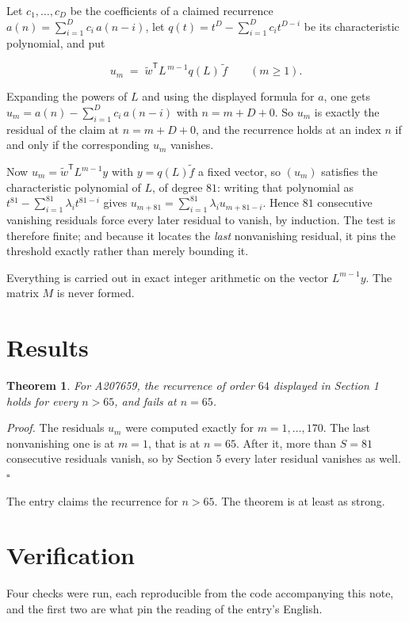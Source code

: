 \documentclass[11pt]{article}
\newtheorem{theorem}{Theorem}
\theoremstyle{definition}
\begin{document}
Let $c_1,\dots,c_D$ be the coefficients of a claimed recurrence $a(n) = \sum_{i=1}^{D} c_i\,a(n-i)$, let $q(t) = t^{D} - \sum_{i=1}^{D} c_i t^{D-i}$ be its characteristic polynomial, and put

\[u_m \;=\; \tilde w^{\mathsf T} L^{\,m-1} q(L)\,\tilde f \qquad (m \ge 1).\]

Expanding the powers of $L$ and using the displayed formula for $a$, one gets $u_m = a(n) - \sum_{i=1}^{D} c_i\,a(n-i)$ with $n = m + D + 0$. So $u_m$ is exactly the residual of the claim at $n = m + D + 0$, and the recurrence holds at an index $n$ if and only if the corresponding $u_m$ vanishes.

Now $u_m = \tilde w^{\mathsf T} L^{m-1} y$ with $y = q(L)\tilde f$ a fixed vector, so $(u_m)$ satisfies the characteristic polynomial of $L$, of degree $81$: writing that polynomial as $t^{81} - \sum_{i=1}^{81} \lambda_i t^{81-i}$ gives $u_{m+81} = \sum_{i=1}^{81} \lambda_i u_{m+81-i}$. Hence $81$ consecutive vanishing residuals force every later residual to vanish, by induction. The test is therefore finite; and because it locates the {\itshape last} nonvanishing residual, it pins the threshold exactly rather than merely bounding it.

Everything is carried out in exact integer arithmetic on the vector $L^{m-1}y$. The matrix $M$ is never formed.

\section{Results}

\begin{theorem} For A207659, the recurrence of order $64$ displayed in Section 1 holds for every $n > 65$, and fails at $n = 65$.\end{theorem}

{\itshape Proof.} The residuals $u_m$ were computed exactly for $m = 1,\dots,170$. The last nonvanishing one is at $m = 1$, that is at $n = 65$. After it, more than $S = 81$ consecutive residuals vanish, so by Section 5 every later residual vanishes as well. $\square$

The entry claims the recurrence for $n > 65$. The theorem is at least as strong.

\section{Verification}

Four checks were run, each reproducible from the code accompanying this note, and the first two are what pin the reading of the entry's English.
\end{document}
